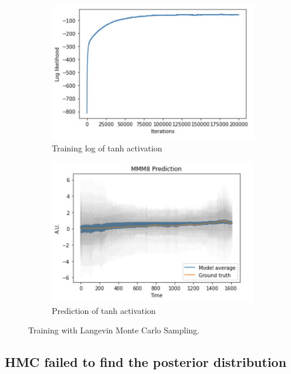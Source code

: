 \documentclass{article}
\begin{document}
\begin{figure}[h]
\begin{subfigure}[b]{0.5\textwidth}
    \end{subfigure}
    \begin{subfigure}[b]{0.5\textwidth}
        \centering
        \includegraphics[width=\textwidth]{../img/training_Langevin_200000_tanh.png}
        \caption{Training log of tanh activation}
    \end{subfigure}\hfill
    \begin{subfigure}[b]{0.5\textwidth}
        \centering
        \includegraphics[trim={0 0 0 0.7cm}, clip, width=\textwidth]{../img/prediction_Langevin_200000_tanh.png}
        \caption{Prediction of tanh activation}
    \end{subfigure}
    \caption{Training with Langevin Monte Carlo Sampling.}
\end{figure}


\subsection{HMC failed to find the posterior distribution}
\end{document}
